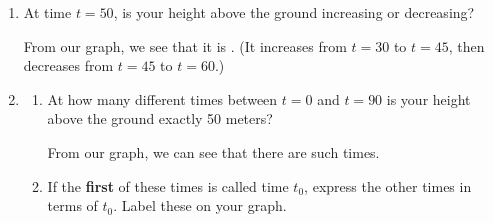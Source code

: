 \documentclass{article}
\begin{document}
\begin{enumerate}[topsep=0pt]
\begin{enumerate}[topsep=0pt]
\begin{solution}
    \end{solution}

  \item
    \begin{problem}[\stretch{0.5}]
      At time $t = 50$, is your height above the ground increasing or
      decreasing? 
    \end{problem}

    \begin{solution}
      From our graph, we see that it is .  (It increases
      from $t = 30$ to $t = 45$, then decreases from $t = 45$ to $t =
      60$.) 
    \end{solution}

  \item
    \begin{enumerate}
    \item 
      \begin{problem}[\stretch{0.5}]
        At how many different times between $t = 0$ and $t = 90$ is your
        height above the ground exactly 50 meters? 
      \end{problem}

      \begin{solution}
        From our graph, we can see that there are  such times. 
      \end{solution}

    \item 
      \begin{problem}[\stretch{1.5}]        
        If the \textbf{first} of these times is called time $t_0$, express
        the other times in terms of $t_0$.  Label these on your graph. 
      \end{problem}


\end{enumerate}
\end{enumerate}
\end{enumerate}
\end{document}
